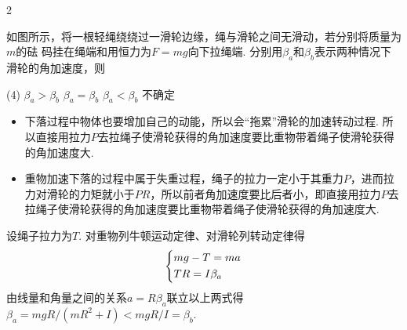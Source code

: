 \begin{paracol}{2}
\begin{problem}
    如图所示，将一根轻绳绕绕过一滑轮边缘，绳与滑轮之间无滑动，若分别将质量为$m$的砝 码挂在绳端和用恒力为$F=mg$向下拉绳端. 分别用$\beta_a$和$\beta_b$表示两种情况下滑轮的角加速度，则
    \begin{tasks}(4)
        \task $\beta_a>\beta_b$
        \task $\beta_a=\beta_b$
        \task[\true] $\beta_a<\beta_b$
        \task 不确定
    \end{tasks}
    \switchcolumn\vspace*{\fill}\centering
    \vspace*{\fill}
\end{problem}
\end{paracol}
\begin{note}\leavevmode
\begin{itemize}
    \item 下落过程中物体也要增加自己的动能，所以会``拖累''滑轮的加速转动过程. 所以直接用拉力$P$去拉绳子使滑轮获得的角加速度要比重物带着绳子使滑轮获得的角加速度大.
    \item 重物加速下落的过程中属于失重过程，绳子的拉力一定小于其重力$P$，进而拉力对滑轮的力矩就小于$PR$，所以前者角加速度要比后者小，即直接用拉力$P$去拉绳子使滑轮获得的角加速度要比重物带着绳子使滑轮获得的角加速度大.
\end{itemize}
\end{note}
\begin{solution}
    设绳子拉力为$T$. 对重物列牛顿运动定律、对滑轮列转动定律得
    \[\begin{dcases}
        mg-T=ma\\
        TR=I\beta_a
    \end{dcases}\]
    由线量和角量之间的关系$a=R\beta_a$联立以上两式得$\beta_a=mgR/(mR^2+I)<mgR/I=\beta_b$.
\end{solution}

